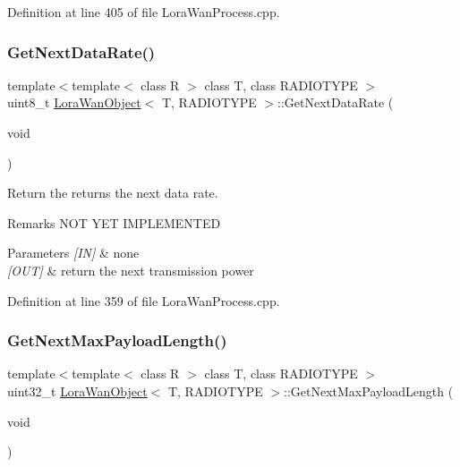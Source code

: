Definition at line 405 of file Lora\+Wan\+Process.\+cpp.

\mbox{\label{class_lora_wan_object_a4e9211e749e9d12bc6a044a7381efcb8}} 
\subsubsection{\texorpdfstring{Get\+Next\+Data\+Rate()}{GetNextDataRate()}}
{\footnotesize\ttfamily template$<$template$<$ class R $>$ class T, class R\+A\+D\+I\+O\+T\+Y\+PE $>$ \\
uint8\+\_\+t \mbox{\hyperlink{class_lora_wan_object}{Lora\+Wan\+Object}}$<$ T, R\+A\+D\+I\+O\+T\+Y\+PE $>$\+::Get\+Next\+Data\+Rate (\begin{DoxyParamCaption}\item[{void}]{ }\end{DoxyParamCaption})}



Return the returns the next data rate. 

\begin{DoxyRemark}{Remarks}
N\+OT Y\+ET I\+M\+P\+L\+E\+M\+E\+N\+T\+ED 
\end{DoxyRemark}

\begin{DoxyParams}{Parameters}
{\em \mbox{[}\+I\+N\mbox{]}} & none \\
\hline
{\em \mbox{[}\+O\+U\+T\mbox{]}} & return the next transmission power \\
\hline
\end{DoxyParams}


Definition at line 359 of file Lora\+Wan\+Process.\+cpp.

\mbox{\label{class_lora_wan_object_a5a43bf270bf1b0b3642d7989d8746023}} 
\subsubsection{\texorpdfstring{Get\+Next\+Max\+Payload\+Length()}{GetNextMaxPayloadLength()}}
{\footnotesize\ttfamily template$<$template$<$ class R $>$ class T, class R\+A\+D\+I\+O\+T\+Y\+PE $>$ \\
uint32\+\_\+t \mbox{\hyperlink{class_lora_wan_object}{Lora\+Wan\+Object}}$<$ T, R\+A\+D\+I\+O\+T\+Y\+PE $>$\+::Get\+Next\+Max\+Payload\+Length (\begin{DoxyParamCaption}\item[{void}]{ }\end{DoxyParamCaption})}



